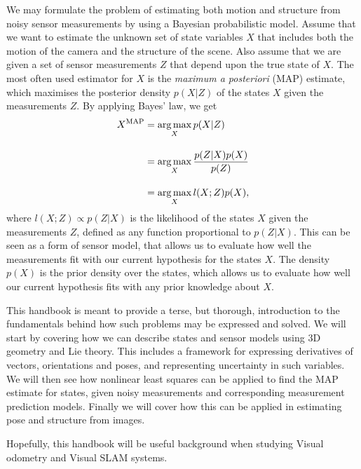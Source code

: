We may formulate the problem of estimating both motion and structure from noisy sensor measurements by using a Bayesian probabilistic model.
Assume that we want to estimate the unknown set of state variables $X$ that includes both the motion of the camera and the structure of the scene.
Also assume that we are given a set of sensor measurements $Z$ that depend upon the true state of $X$.
The most often used estimator for $X$ is the \emph{maximum a posteriori} (MAP) estimate, which maximises the posterior density $p(X | Z)$ of the states $X$ given the measurements $Z$.
By applying Bayes' law, we get
\begin{align*}
    X^\text{MAP} &= \operatorname*{arg\,max}_X p(X | Z)\\[1em]
    &= \operatorname*{arg\,max}_X \frac{p(Z | X) p(X)}{p(Z)}\\[1em]
    &= \operatorname*{arg\,max}_X l(X;Z) p(X),
\end{align*}
where $l(X;Z) \propto p(Z | X)$ is the likelihood of the states $X$ given the measurements $Z$, defined as any function proportional to $p(Z | X)$.
This can be seen as a form of sensor model, that allows us to evaluate how well the measurements fit with our current hypothesis for the states $X$.
The density $p(X)$ is the prior density over the states, which allows us to evaluate how well our current hypothesis fits with any prior knowledge about $X$.

This handbook is meant to provide a terse, but thorough, introduction to the fundamentals behind how such problems may be expressed and solved.
We will start by covering how we can describe states and sensor models using 3D geometry and Lie theory.
This includes a framework for expressing derivatives of vectors, orientations and poses, and representing uncertainty in such variables.
We will then see how nonlinear least squares can be applied to find the MAP estimate for states, given noisy measurements and corresponding measurement prediction models.
Finally we will cover how this can be applied in estimating pose and structure from images.

Hopefully, this handbook will be useful background when studying Visual odometry and Visual SLAM systems.
